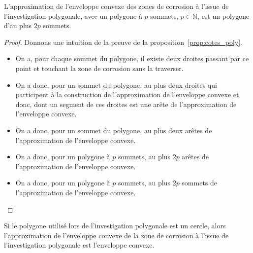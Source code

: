 \documentclass[english,RandD]{rapportPFE}  %
\begin{document}
				\begin{Proposition}
					L'approximation de l'enveloppe convexe des zones de corrosion à l'issue de l'investigation polygonale, avec un polygone à $p$ sommets, $p \in \mathbb{N}$, est un polygone d'au plus $2p$ sommets.
					\label{prop:cotes_poly}
				\end{Proposition}
				\begin{proof}
					Donnons une intuition de la preuve de la proposition~\ref{prop:cotes_poly}.
					\begin{itemize}
						\item On a, pour chaque sommet du polygone, il existe deux droites passant par ce point et touchant la zone de corrosion sans la traverser.
						\item On a donc, pour un sommet du polygone, au plus deux droites qui participent à la construction de l'approximation de l'enveloppe convexe et donc, dont un segment de ces droites est une arête de l'approximation de l'enveloppe convexe.
						\item On a donc, pour un sommet du polygone, au plus deux arêtes de l'approximation de l'enveloppe convexe.
						\item On a donc, pour un polygone à $p$ sommets, au plus $2p$ arêtes de l'approximation de l'enveloppe convexe.
						\item On a donc, pour un polygone à $p$ sommets, au plus $2p$ sommets de l'approximation de l'enveloppe convexe.
					\end{itemize}
				\end{proof}

				\begin{Conjecture}
					Si le polygone utilisé lors de l'investigation polygonale est un cercle, alors l'approximation de l'enveloppe convexe de la zone de corrosion à l'issue de l'investigation polygonale est l'enveloppe convexe.
					\label{prop:cercle}
				\end{Conjecture}
\end{document}
